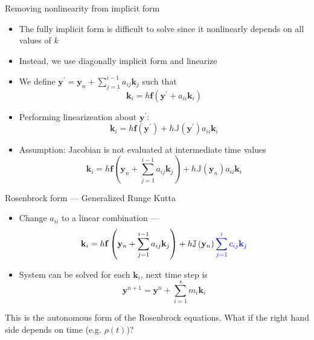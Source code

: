 \documentclass[serif]{beamer}
\begin{document}
\begin{frame}{Removing nonlinearity from implicit form}
  \begin{itemize}
  \item<1-> The fully implicit form is difficult to solve since it nonlinearly depends on all values of $k$
  \item<1-> Instead, we use diagonally implicit form and linearize
  \vfill
  \item<2->  We define $\mathbf{y}^\prime = \mathbf{y}_n + \sum_{j=1}^{i-1}a_{ij}\mathbf{k}_j$ such that
  \begin{equation}
    \nonumber \mathbf{k}_i = h\mathbf{f}\left(\mathbf{y}^\prime + a_{ii}\mathbf{k}_i\right) 
  \end{equation}
  \item<3-> Performing linearizeation about $\mathbf{y}^\prime$:
  \begin{equation}
   \nonumber \mathbf{k}_i = h\mathbf{f}\left(\mathbf{y}^\prime\right) + h\mathbb{J}\left(\mathbf{y}^\prime\right)a_{ii}\mathbf{k}_i
  \end{equation}
  \item<3-> \alert{Assumption:} Jacobian is not evaluated at intermediate time values
  \begin{equation}
   \nonumber \mathbf{k}_i = h\mathbf{f}\left(\mathbf{y}_n + \sum_{j=1}^{i-1}a_{ij}\mathbf{k}_j\right) + h\mathbb{J}\left(\mathbf{y}_n\right)a_{ii}\mathbf{k}_i
  \end{equation}
  \end{itemize}
\end{frame}

\begin{frame}{Rosenbrock form --- Generalized Runge Kutta}
  \begin{itemize}
  \item<1-> Change $a_{ii}$ to a linear combination ---
  \begin{equation}
    \nonumber \mathbf{k}_i = h\mathbf{f}\left(\mathbf{y}_n + \sum_{j=1}^{i-1}a_{ij}\mathbf{k}_j\right) +     
     h\mathbb{J}\left(\mathbf{y}_n\right)\color{blue}\sum_{j=1}^{i}c_{ij}\mathbf{k}_j
  \end{equation}
  \item<1-> System can be solved for each $\mathbf{k}_i$, next time step is
  \begin{equation}
  \nonumber \mathbf{y}^{n+1} = \mathbf{y}^n + \sum_{i=1}^s m_i \mathbf{k}_i
  \end{equation}
  \end{itemize}
  \begin{center}
    This is the autonomous form of the Rosenbrock equations. What if the right hand side depends on time (e.g. $\rho(t)$)?
  \end{center}
\end{frame}
\end{document}
